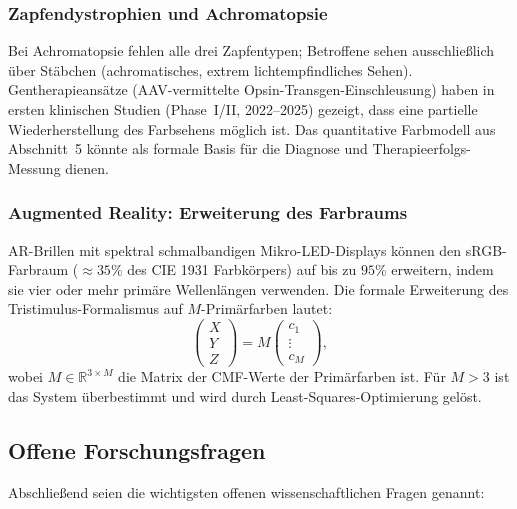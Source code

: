 ﻿\documentclass[a4paper,12pt]{article}
\theoremstyle{definition}
\begin{document}
\subsubsection{Zapfendystrophien und Achromatopsie}

Bei Achromatopsie fehlen alle drei Zapfentypen; Betroffene sehen ausschließlich über
Stäbchen (achromatisches, extrem lichtempfindliches Sehen). Gentherapieansätze
(AAV-vermittelte Opsin-Transgen-Einschleusung) haben in ersten klinischen Studien
(Phase~I/II, 2022--2025) gezeigt, dass eine partielle Wiederherstellung des Farbsehens
möglich ist. Das quantitative Farbmodell aus Abschnitt~5 könnte als formale Basis
für die Diagnose und Therapieerfolgs-Messung dienen.

\subsubsection{Augmented Reality: Erweiterung des Farbraums}

AR-Brillen mit spektral schmalbandigen Mikro-LED-Displays können den sRGB-Farbraum
($\approx 35\%$ des CIE 1931 Farbkörpers) auf bis zu $95\%$ erweitern,
indem sie vier oder mehr primäre Wellenlängen verwenden. Die formale Erweiterung
des Tristimulus-Formalismus auf $M$-Primärfarben lautet:
\[
  \begin{pmatrix}X\\Y\\Z\end{pmatrix} = M \begin{pmatrix}c_1\\\vdots\\c_M\end{pmatrix},
\]
wobei $M \in \mathbb{R}^{3\times M}$ die Matrix der CMF-Werte der Primärfarben ist.
Für $M > 3$ ist das System überbestimmt und wird durch Least-Squares-Optimierung gelöst.

\subsection{Offene Forschungsfragen}

Abschließend seien die wichtigsten offenen wissenschaftlichen Fragen genannt:
\end{document}
